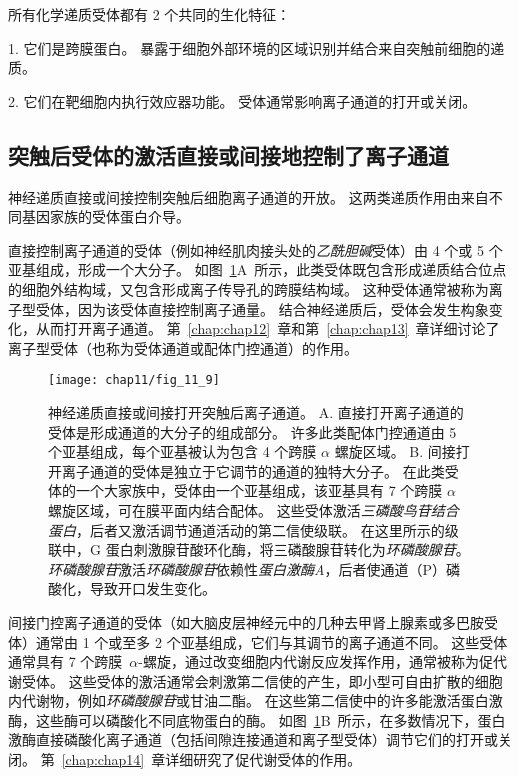 所有化学递质受体都有 2 个共同的生化特征：

1. 它们是跨膜蛋白。
暴露于细胞外部环境的区域识别并结合来自突触前细胞的递质。


2. 它们在靶细胞内执行效应器功能。
受体通常影响离子通道的打开或关闭。



\subsection{突触后受体的激活直接或间接地控制了离子通道}

神经递质直接或间接控制突触后细胞离子通道的开放。
这两类递质作用由来自不同基因家族的受体蛋白介导。


直接控制离子通道的受体（例如神经肌肉接头处的\textit{乙酰胆碱}受体）由 4 个或 5 个亚基组成，形成一个大分子。
如图~\ref{fig:11_9}A~所示，此类受体既包含形成递质结合位点的细胞外结构域，又包含形成离子传导孔的跨膜结构域。
这种受体通常被称为离子型受体，因为该受体直接控制离子通量。
结合神经递质后，受体会发生构象变化，从而打开离子通道。
第~\ref{chap:chap12}~章和第~\ref{chap:chap13}~章详细讨论了离子型受体（也称为受体通道或配体门控通道）的作用。


\begin{figure}[htbp]
	\centering
	\texttt{[image: chap11/fig\_11\_9]}
	\caption{神经递质直接或间接打开突触后离子通道。
		A. 直接打开离子通道的受体是形成通道的大分子的组成部分。
		许多此类配体门控通道由 5 个亚基组成，每个亚基被认为包含 4 个跨膜 $\alpha$ 螺旋区域。
		B. 间接打开离子通道的受体是独立于它调节的通道的独特大分子。
		在此类受体的一个大家族中，受体由一个亚基组成，该亚基具有 7 个跨膜 $\alpha$ 螺旋区域，可在膜平面内结合配体。
		这些受体激活\textit{三磷酸鸟苷结合蛋白}，后者又激活调节通道活动的第二信使级联。
		在这里所示的级联中，G 蛋白刺激腺苷酸环化酶，将三磷酸腺苷转化为\textit{环磷酸腺苷}。
		\textit{环磷酸腺苷}激活\textit{环磷酸腺苷}依赖性\textit{蛋白激酶A}，后者使通道（P）磷酸化，导致开口发生变化。}
	\label{fig:11_9}
\end{figure}


间接门控离子通道的受体（如大脑皮层神经元中的几种去甲肾上腺素或多巴胺受体）通常由 1 个或至多 2 个亚基组成，它们与其调节的离子通道不同。
这些受体通常具有 7 个跨膜~$\alpha$-螺旋，通过改变细胞内代谢反应发挥作用，通常被称为促代谢受体。
这些受体的激活通常会刺激第二信使的产生，即小型可自由扩散的细胞内代谢物，例如\textit{环磷酸腺苷}或甘油二酯。
在这些第二信使中的许多能激活蛋白激酶，这些酶可以磷酸化不同底物蛋白的酶。
如图~\ref{fig:11_9}B~所示，在多数情况下，蛋白激酶直接磷酸化离子通道（包括间隙连接通道和离子型受体）调节它们的打开或关闭。
第~\ref{chap:chap14}~章详细研究了促代谢受体的作用。


